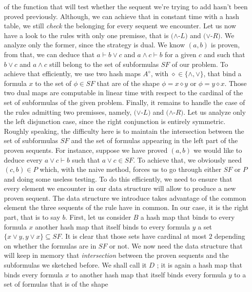 \documentclass[a4paper, 11pt]{article}
\begin{document}
    of the function that will test whether the sequent we're trying to add hasn't been proved previously.
    Although, we can achieve that in constant time with a hash table, we still \textit{check} the 
    belonging for every sequent we encounter. %
    Let us now have a look to the rules with only
    one premisse, that is $(\wedge$-$L)$ and $(\vee$-$R)$. We analyze only the former, since the strategy
    is dual. We know $(a,b)$ is proven, from that, we can deduce that $a\vdash b\vee c$ and 
    $a\wedge c\vdash b$ for a given $c$ and such that $b\vee c$ and $a\wedge c$ still belong to the set 
    of subformulas $SF$ of our problem. To achieve that efficiently, we use two hash maps $A^\diamond$,
    with $\diamond\in\{\wedge,\vee\}$, that bind a formula $x$ to the set of $\phi\in SF$ that are of
    the shape $\phi=x\diamond y$ or $\phi=y\diamond x$. Those two dual maps are computable in linear time
    with respect to the cardinal of the set of subformulas of the given problem. Finally, it remains to
    handle the case of the rules admitting two premisses, namely, $(\vee$-$L)$ and $(\wedge$-$R)$. Let us
    analyze only the left disjunction case, since the right conjunction is entirely symmetric. Roughly
    speaking, the difficulty here is to maintain the intersection between the set of subformulas $SF$
    and the set of formulas appearing in the left part of the proven sequents. For instance, suppose
    we have proved $(a,b)$ we would like to deduce every $a\vee c\vdash b$ such that $a\vee c\in SF$.
    To achieve that, we obviously need $(c,b)\in P$ which, with the naive method, forces us to go through
    either $SF$ or $P$ and doing some useless testing. To do this efficiently, we need to ensure that
    every element we encounter in our data structure will allow to produce a new proven sequent. The
    data structure we introduce takes advantage of the common element the three sequents of the rule
    have in common. In our case, it is the right part, that is to say $b$. First, let us consider 
    $B$ a hash map that binds to every formula $x$ another hash map that itself binds to every 
    formula $y$ a set $\{x\vee y,y\vee x\}\subseteq SF$. It is clear that those sets have cardinal at 
    most $2$ depending on whether the formulas are in $SF$ or not. We now need the data structure that
    will keep in memory that \textit{intersection} between the proven sequents and the subformulas we
    sketched before. We shall call it $D$ ; it is again a hash map that binds every formula $x$ to
    another hash map that itself binds every formula $y$ to a set of formulas that is of the shape
\end{document}
